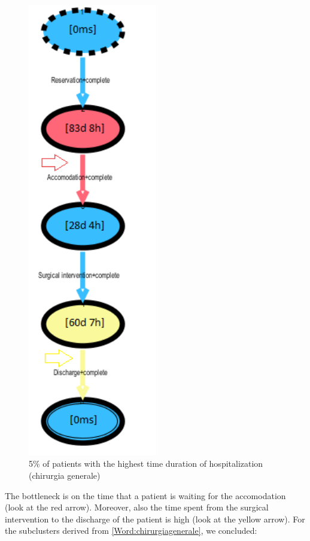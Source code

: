 \begin{figure} [htbp]
\begin{minipage}[t]{0.32\textwidth}
\includegraphics[width=0.5\textwidth]{RicoveriTransitionSystemSojourn0901Slow}
\caption{5\% of patients with the highest time duration of hospitalization (chirurgia generale)}
\end{minipage}
\end{figure}
\clearpage
\noindent
The bottleneck is on the time that a patient is waiting for the accomodation (look at the red arrow). Moreover, also the time spent from the surgical intervention to the discharge of the patient is high (look at the yellow arrow). For the subclusters derived from \ref{Word:chirurgiagenerale}, we concluded:
